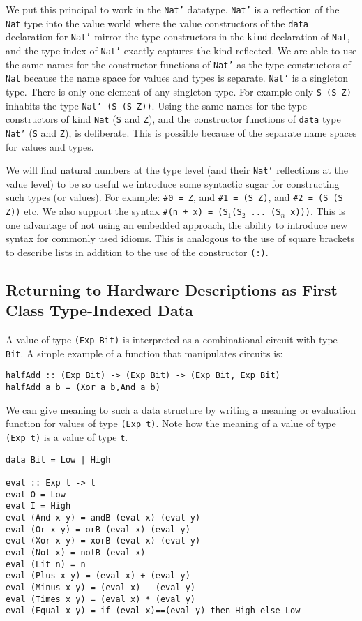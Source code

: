 \documentclass[10pt,twoside]{article}
\begin{document}
We put this principal to work in the {\tt Nat'} datatype. {\tt Nat'} is a
reflection of the {\tt Nat} type into the value world where the value
constructors of the {\tt data} declaration for {\tt Nat'} mirror the type
constructors in the {\tt kind} declaration of {\tt Nat}, and the type index
of {\tt Nat'} exactly captures the kind reflected. We are able to use the
same names for the constructor functions of {\tt Nat'} as the type
constructors of {\tt Nat} because the name space for values and types is
separate. {\tt Nat'} is a singleton type. There is only one element of any
singleton type. For example only {\tt S (S Z)} inhabits the type {\tt Nat' (S
(S Z))}. Using the same names for the type constructors of kind {\tt Nat}
({\tt S} and {\tt Z}),
and the constructor functions of {\tt data} type {\tt Nat'} ({\tt S} and {\tt Z}), is deliberate.
This is possible because of the separate name spaces for values and types.


We will find natural numbers at the type level (and their {\tt Nat'}
reflections at the value level) to be so useful we introduce some syntactic
sugar for constructing such types (or values). For example:
{\tt \#0 = Z}, and {\tt \#1 = (S Z)}, and {\tt \#2 = (S (S Z))} etc.
We also support the syntax {\tt \#(n + x) = (S$_1$(S$_2$ ... (S$_n$ x)))}.
This is one advantage of not using an embedded approach, the ability to
introduce new syntax for commonly used idioms. This is analogous to
the use of square brackets to describe lists in addition to the use
of the constructor \verb+(:)+.

\subsection{Returning to Hardware Descriptions as First Class Type-Indexed Data}

A value of type {\tt (Exp Bit)} is interpreted as a 
combinational circuit with type {\tt Bit}. A simple example of a
function that manipulates circuits is:

\begin{verbatim} 
halfAdd :: (Exp Bit) -> (Exp Bit) -> (Exp Bit, Exp Bit)
halfAdd a b = (Xor a b,And a b) 
\end{verbatim} 

We can give meaning to such a data structure by writing a meaning
or evaluation function for values of type {\tt (Exp t)}. Note
how the meaning of a value of type {\tt (Exp t)} is a value of type {\tt t}.
\begin{verbatim}
data Bit = Low | High

eval :: Exp t -> t
eval O = Low
eval I = High
eval (And x y) = andB (eval x) (eval y)
eval (Or x y) = orB (eval x) (eval y)
eval (Xor x y) = xorB (eval x) (eval y)
eval (Not x) = notB (eval x)
eval (Lit n) = n
eval (Plus x y) = (eval x) + (eval y)
eval (Minus x y) = (eval x) - (eval y)
eval (Times x y) = (eval x) * (eval y)
eval (Equal x y) = if (eval x)==(eval y) then High else Low
\end{verbatim}
\end{document}
